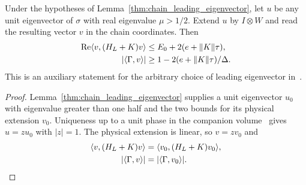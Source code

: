 \begin{lemma}
    \label{thm:chain_leading_eigenvector_uniform_bounds}
    \leanok
    Under the hypotheses of Lemma~\ref{thm:chain_leading_eigenvector},
    let $u$ be any unit eigenvector of $\sigma$ with real eigenvalue
    $\mu>1/2$. Extend $u$ by $I\otimes W$ and read the resulting vector
    $v$ in the chain coordinates. Then
    \begin{align}
        \operatorname{Re}\langle v,(H_L+K)v\rangle
         & \le E_0+2(e+\|K\|\tau),\notag     \\
        |\langle\Gamma,v\rangle|
         & \ge1-2(e+\|K\|\tau)/\Delta.\notag
    \end{align}
    This is an auxiliary statement for the arbitrary choice of leading
    eigenvector in~\cite[Lemma~2.5, source lines 493--505]{Landau2015Polynomial}.
\end{lemma}
\begin{proof}\leanok
    Lemma~\ref{thm:chain_leading_eigenvector} supplies a unit eigenvector
    $u_0$ with eigenvalue greater than one half and the two bounds for its
    physical extension $v_0$.
    Uniqueness up to a unit phase in the companion
    volume~\cite[``Uniqueness of an eigenvector above one half'']{QICLean2026Blueprint}
    gives $u=zu_0$ with $|z|=1$. The physical extension is linear, so
    $v=zv_0$ and
    \begin{align}
        \langle v,(H_L+K)v\rangle & =\langle v_0,(H_L+K)v_0\rangle,\notag \\
        |\langle\Gamma,v\rangle|  & =|\langle\Gamma,v_0\rangle|.\notag
    \end{align}
\end{proof}

